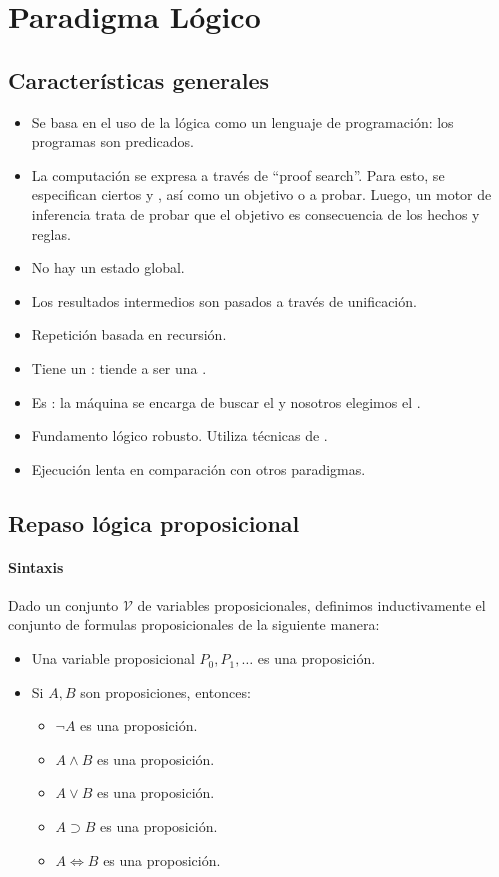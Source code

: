 \section{Paradigma Lógico}

\subsection{Características generales}

\begin{itemize}
  \item Se basa en el uso de la lógica como un lenguaje de programación: los programas son predicados.
  \item La computación se expresa a través de ``proof search''. Para esto, se especifican ciertos  y , así como un objetivo o  a probar. Luego, un motor de inferencia trata de probar que el objetivo es consecuencia de los hechos y reglas.
  \item No hay un estado global.
  \item Los resultados intermedios son pasados a través de unificación.
  \item Repetición basada en recursión.
  \item Tiene un : tiende a ser una .
  \item Es : la máquina se encarga de buscar el  y nosotros elegimos el .
  \item Fundamento lógico robusto. Utiliza técnicas de .
  \item Ejecución lenta en comparación con otros paradigmas.
\end{itemize}

\subsection{Repaso lógica proposicional}

\paragraph{Sintaxis}

Dado un conjunto $\mathcal{V}$ de variables proposicionales, definimos inductivamente el conjunto de formulas proposicionales de la siguiente manera:

\begin{itemize}
  \item Una variable proposicional $P_0, P_1, \dots$ es una proposición.
  \item Si $A, B$ son proposiciones, entonces:
    \begin{itemize}
      \item $\lnot A$ es una proposición.
      \item $A \land B$ es una proposición.
      \item $A \lor B$ es una proposición.
      \item $A \supset B$ es una proposición.
      \item $A \iff B$ es una proposición.
    \end{itemize}
\end{itemize}

